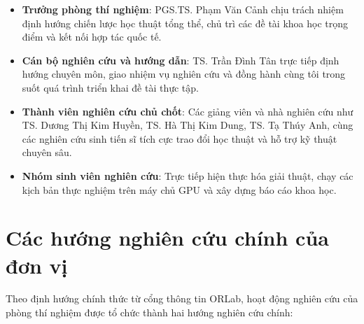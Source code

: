\begin{itemize}
    \item \textbf{Trưởng phòng thí nghiệm}: PGS.TS. Phạm Văn Cảnh chịu trách nhiệm định hướng chiến lược học thuật tổng thể, chủ trì các đề tài khoa học trọng điểm và kết nối hợp tác quốc tế.
    \item \textbf{Cán bộ nghiên cứu và hướng dẫn}: TS. Trần Đình Tân trực tiếp định hướng chuyên môn, giao nhiệm vụ nghiên cứu và đồng hành cùng tôi trong suốt quá trình triển khai đề tài thực tập.
    \item \textbf{Thành viên nghiên cứu chủ chốt}: Các giảng viên và nhà nghiên cứu như TS. Dương Thị Kim Huyền, TS. Hà Thị Kim Dung, TS. Tạ Thúy Anh, cùng các nghiên cứu sinh tiến sĩ tích cực trao đổi học thuật và hỗ trợ kỹ thuật chuyên sâu.
    \item \textbf{Nhóm sinh viên nghiên cứu}: Trực tiếp hiện thực hóa giải thuật, chạy các kịch bản thực nghiệm trên máy chủ GPU và xây dựng báo cáo khoa học.
\end{itemize}

\section{Các hướng nghiên cứu chính của đơn vị}
\label{sec:cac_huong_nghien_cuu_orlab}

Theo định hướng chính thức từ cổng thông tin ORLab, hoạt động nghiên cứu của phòng thí nghiệm được tổ chức thành hai hướng nghiên cứu chính:

